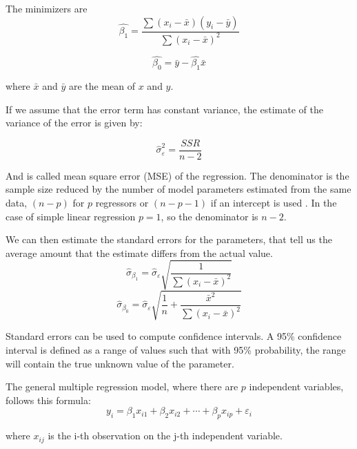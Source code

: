 The minimizers are
\begin{equation}
	\widehat{\beta_{1}} = \frac{\sum(x_i - \bar{x})(y_i - \bar{y})}{\sum(x_i - \bar{x})^2}
\end{equation}

\begin{equation}
	\widehat{\beta_{0}} = \bar{y} - \widehat{\beta_{1}} \bar {x}
\end{equation}

where $\bar{x}$ and $\bar{y}$ are the mean of $x$ and $y$.

If we assume that the error term has constant variance, the estimate of the variance of the error is given by:

\begin{equation}
	\widehat{\sigma}_{\varepsilon }^{2} = \frac{SSR}{n-2}
\end{equation}

And is called mean square error (MSE) of the regression. The denominator is the sample size reduced by the number of model parameters estimated from the same data, $(n-p)$ for $p$ regressors or  $(n-p-1)$ if an intercept is used \cite{MSE}. In the case of simple linear regression $p=1$, so the denominator is $n-2$.

We can then estimate the standard errors for the parameters, that tell us the average amount that the estimate differs from the actual value.
\begin{equation}
	{\widehat{\sigma}_{\beta _{1}} = {\widehat{\sigma}_{\varepsilon}{\sqrt{\frac{1}{\sum(x_{i} - {\bar {x}})^{2}}}}}}
\end{equation}
\begin{equation}
	{\widehat{\sigma}_{\beta _{0}} = {\widehat{\sigma}_{\varepsilon}{\sqrt{\frac{1}{n} + \frac{\bar{x}^2}{\sum(x_{i} - {\bar {x}})^{2}}}}}}
\end{equation}

Standard errors can be used to compute confidence intervals. A 95\% confidence interval is defined as a range of values such that with 95\% probability, the range will contain the true unknown value of the parameter.

The general multiple regression model, where there are $p$ independent variables, follows this formula:
\begin{equation}
	y_{i}=\beta_{1}x_{i1} + \beta_{2}x_{i2} + \cdots + \beta_{p}x_{ip} + \varepsilon_{i}
\end{equation}

where $x_{ij}$ is the i-th observation on the j-th independent variable.

